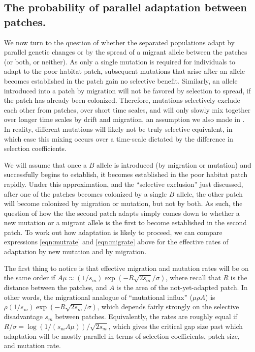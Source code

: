 \documentclass{article}
\begin{document}
\subsection{The probability of parallel adaptation between patches.} 
\label{ss:probparallel}

We now turn to the question of whether the separated populations adapt by parallel genetic changes 
or by the spread of a migrant allele between the patches
(or both, or neither).
As only a single mutation is required for individuals to adapt to the
poor habitat patch, subsequent mutations that arise after an allele becomes established in the patch gain no selective benefit. 
Similarly, an allele introduced into a patch by migration will not be favored by selection to spread, 
if the patch has already been colonized. 
Therefore, mutations selectively exclude each other from patches, over short time scales, 
and will only slowly mix together over longer time scales by drift and migration,
an assumption we also made in \citep{ralph2010parallel}. 
In reality, different mutations will likely not be truly selective equivalent,
in which case this mixing occurs over a time-scale dictated by the difference in selection coefficients.

We will assume that once a $B$ allele is introduced (by migration or mutation) and successfully begins to establish,
it becomes established in the poor habitat patch rapidly. 
Under this approximation, and the ``selective exclusion'' just discussed,
after one of the patches becomes colonized by a single $B$ allele, 
the other patch will become colonized by migration or mutation, but not by both. 
As such, the question of how the the second patch adapts
simply comes down to whether a new mutation or a migrant allele is the first to become established in the second patch. 
To work out how adaptation is likely to proceed, 
we can compare expressions \eqref{eqn:mutrate} and \eqref{eqn:migrate} above
for the effective rates of adaptation by new mutation and by migration.

The first thing to notice is that effective migration and mutation rates will be on the same order if 
$A \mu \approx (1/s_m) \exp(- R \sqrt{2 s_m} / \sigma)$,
where recall that $R$ is the distance between the patches,
and $A$ is the area of the not-yet-adapted patch.
In other words, the migrational analogue of ``mutational influx'' ($\mu \rho A$) 
is $\rho (1/s_m) \exp(- R \sqrt{2 s_m} / \sigma)$,
which depends fairly strongly on the selective disadvantage $s_m$ between patches.
Equivalently, the rates are roughly equal if
$R/\sigma = \log(1/(s_m A \mu))/\sqrt{2s_m}$,
which gives the critical gap size past which adaptation will be mostly parallel
in terms of selection coefficients, patch size, and mutation rate.
\end{document}
